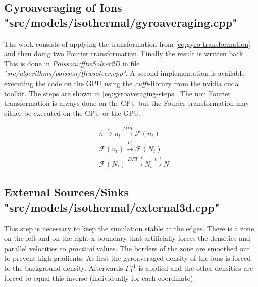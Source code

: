 \documentclass[master.tex]{subfiles}
\begin{document}
\subsection{Gyroaveraging of Ions {\small "src/models/isothermal/gyroaveraging.cpp"}}
\label{sec:components-gryoaverage}
The work consists of applying the transformation from \autoref{eq:gyro-transformation} and then doing two Fourier transformation. Finally the result is written back. This is done in \textit{Poisson::fftwSolver2D} in file \textit{"src/algorithms/poisson/fftwsolver.cpp"}.
A second implementation is available executing the code on the GPU using the \textit{cufft}-library from the nvidia cuda toolkit. The steps are shown in \autoref{eq:gyroaveraging-steps}. The non Fourier transformation is always done on the CPU but the Fourier transformation may either be executed on the CPU or the GPU.

\begin{equation}\label{eq:gyroaveraging-steps}
    \begin{split}
    &n \overset{t}{\longrightarrow} n_t \overset{DFT}{\longrightarrow} \mathcal{F}(n_t)\\
    &\mathcal{F}(n_t) \overset{\cdot C_i}{\longrightarrow} \mathcal{F}(N_t)\\
    &\mathcal{F}(N_t) \overset{DFT^{-1}}{\longrightarrow} N_t \overset{t^{-1}}{\longrightarrow} N
    \end{split}
\end{equation}

\subsection{External Sources/Sinks {\small "src/models/isothermal/external3d.cpp"}}
\label{sec:components-external}
This step is necessary to keep the simulation stable at the edges. There is a zone on the left and on the right x-boundary that artificially forces the densities and parallel velocities to \textit{practical} values. The borders of the zone are smoothed out to prevent high gradients. At first the gyroaveraged density of the ions is forced to the background density. Afterwards $\Gamma_0^{-1}$ is applied and the other densities are forced to equal this inverse (individually for each coordinate):
\end{document}
